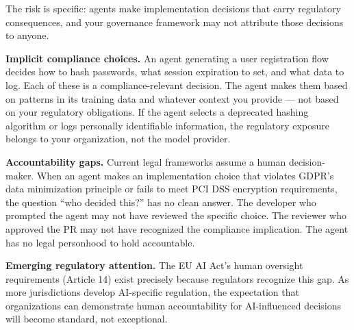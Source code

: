 \documentclass[
  a4paper,
  DIV=11,
  numbers=noendperiod]{scrreprt}
\begin{document}
The risk is specific: agents make implementation decisions that carry
regulatory consequences, and your governance framework may not attribute
those decisions to anyone.

\textbf{Implicit compliance choices.} An agent generating a user
registration flow decides how to hash passwords, what session expiration
to set, and what data to log. Each of these is a compliance-relevant
decision. The agent makes them based on patterns in its training data
and whatever context you provide --- not based on your regulatory
obligations. If the agent selects a deprecated hashing algorithm or logs
personally identifiable information, the regulatory exposure belongs to
your organization, not the model provider.

\textbf{Accountability gaps.} Current legal frameworks assume a human
decision-maker. When an agent makes an implementation choice that
violates GDPR's data minimization principle or fails to meet PCI DSS
encryption requirements, the question ``who decided this?'' has no clean
answer. The developer who prompted the agent may not have reviewed the
specific choice. The reviewer who approved the PR may not have
recognized the compliance implication. The agent has no legal personhood
to hold accountable.

\textbf{Emerging regulatory attention.} The EU AI Act's human oversight
requirements (Article 14) exist precisely because regulators recognize
this gap. As more jurisdictions develop AI-specific regulation, the
expectation that organizations can demonstrate human accountability for
AI-influenced decisions will become standard, not exceptional.
\end{document}

